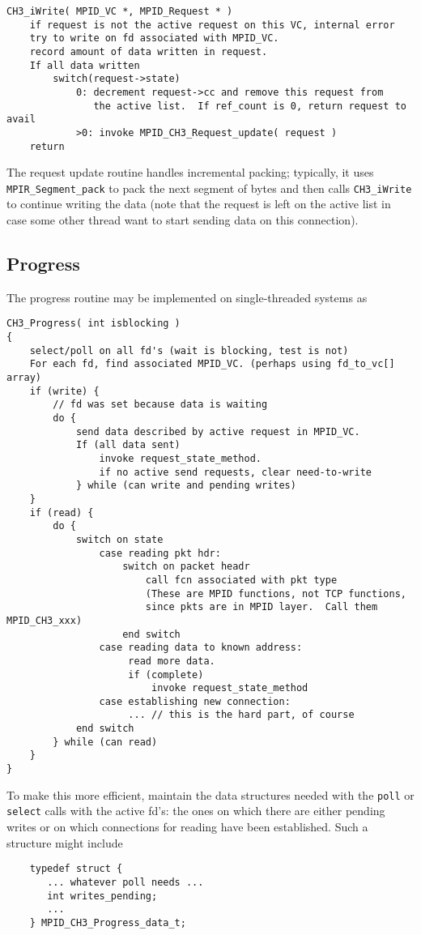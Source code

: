 \documentclass{article}
\def\code{\begingroup\makeustext\eatcode}
\def\eatcode#1{\texttt{#1}\endgroup}
\begin{document}
\begin{verbatim}
CH3_iWrite( MPID_VC *, MPID_Request * )
    if request is not the active request on this VC, internal error
    try to write on fd associated with MPID_VC.  
    record amount of data written in request.
    If all data written
        switch(request->state)
            0: decrement request->cc and remove this request from
               the active list.  If ref_count is 0, return request to avail
            >0: invoke MPID_CH3_Request_update( request )
    return
\end{verbatim}
The request update routine handles incremental packing; typically, it
uses \code{MPIR_Segment_pack} to pack the next segment of bytes and
then calls \code{CH3_iWrite} to continue writing the data (note that
the request is left on the active list in case some other thread want
to start sending data on this connection).

\subsection{Progress}
\label{sec:progress}
The progress routine may be implemented on single-threaded systems as
\begin{verbatim}
CH3_Progress( int isblocking )
{
    select/poll on all fd's (wait is blocking, test is not)
    For each fd, find associated MPID_VC. (perhaps using fd_to_vc[] array)
    if (write) {
        // fd was set because data is waiting
        do {
            send data described by active request in MPID_VC.  
            If (all data sent)
                invoke request_state_method.
                if no active send requests, clear need-to-write
            } while (can write and pending writes)
    }
    if (read) {
        do {
            switch on state
                case reading pkt hdr: 
                    switch on packet headr
                        call fcn associated with pkt type
                        (These are MPID functions, not TCP functions, 
                        since pkts are in MPID layer.  Call them MPID_CH3_xxx) 
                    end switch
                case reading data to known address:
                     read more data.
                     if (complete)
                         invoke request_state_method
                case establishing new connection:
                     ... // this is the hard part, of course
            end switch
        } while (can read)
    }
}
\end{verbatim}
To make this more efficient, maintain the data structures needed with the
\code{poll} or \code{select} calls with the active fd's: the ones on which
there are either pending writes or on which connections for reading have been
established.  Such a structure might include
\begin{verbatim}
    typedef struct { 
       ... whatever poll needs ...
       int writes_pending;
       ...
    } MPID_CH3_Progress_data_t;
\end{verbatim}
\end{document}
